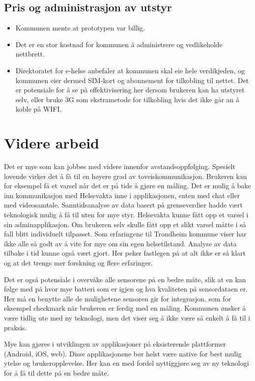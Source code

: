 \subsection{Pris og administrasjon av utstyr}
\begin{itemize}
    \item Kommunen mente at prototypen var billig.
    \item Det er en stor kostnad for kommunen å administrere og vedlikeholde nettbrett.
    \item Direktoratet for e-helse anbefaler at kommunen skal eie hele verdikjeden, og kommunen eier
        dermed SIM-kort og abonnement for tilkobling til nettet. Det er potensiale for å se på
        effektivisering her dersom brukeren kan ha utstyret selv, eller bruke 3G som ekstrametode
        for tilkobling hvis det ikke går an å koble på WIFI.
\end{itemize}

\section{Videre arbeid}
Det er mye som kan jobbes med videre innenfor avstandsoppfølging. Spesielt lovende virker det å få til
en høyere grad av toveiskommunikasjon. Brukeren kan for eksempel få et varsel når det er på tide å gjøre en måling.
Det er mulig å bake inn kommunikasjon med Helsevakta inne i applikasjonen, enten med chat eller med videosamtale.
Sanntidsanalyse av data basert på grenseverdier hadde vært teknologisk mulig å få til uten for mye styr. Helsevakta
kunne fått opp et varsel i sin adminapplikasjon. Om brukeren selv skulle fått opp et slikt varsel måtte i så fall blitt
individuelt tilpasset. Som erfaringene til Trondheim kommune viser har ikke alle så godt av å vite for mye om sin egen
helsetilstand. Analyse av data tilbake i tid kunne også vært gjort. Her peker fastlegen på at alt ikke er så klart og
at det trengs mer forskning og flere erfaringer.

Det er også potensiale i overvåke alle sensorene på en bedre måte, slik at en kan følge med på hvor mye batteri som er igjen
og hva kvaliteten på sensordataen er. Her må en benytte alle de mulighetene sensoren gir for integrasjon, som for eksempel
checkmark når brukeren er ferdig med en måling. Kommunen ønsker å være tidlig ute med
ny teknologi, men det viser seg å ikke være så enkelt å få til i praksis.

Mye kan gjøres i utviklingen av applikasjoner på eksisterende plattformer (Android, iOS, web). Disse applikasjonene bør helst være native for best
mulig ytelse og brukeropplevelse. Her kan en med fordel nyttiggjøre seg av ny teknologi for å få til dette på en bedre måte.
